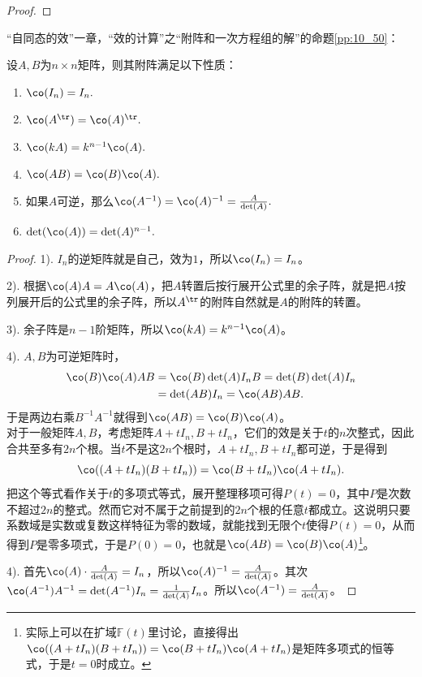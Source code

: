 \documentclass[12pt,UTF8]{ctexbook}
\begin{document}
\begin{appendix}
\begin{proof}
\end{proof}

“自同态的效”一章，“效的计算”之“附阵和一次方程组的解”的命题\ref{pp:10_50}：
\begin{pp}\label{c-25}
    设$A,B$为$n\times n$矩阵，则其附阵满足以下性质：
    \begin{enumerate}
    \item $\co(I_n) = I_n.$
    \item $\co(A^{\tr}) = \co(A)^{\tr}.$
    \item $\co(kA) = k^{n-1}\co(A).$
    \item $\co(AB) = \co(B)\co(A). $
    \item 如果$A$可逆，那么$\co(A^{-1}) = \co(A)^{-1} = \frac{A}{\det(A)}.$
    \item $\det(\co(A)) = \det(A)^{n-1}.$
\end{enumerate}
\end{pp}
\begin{proof}
    1). $I_n$的逆矩阵就是自己，效为$1$，所以$\co(I_n) = I_n$。

    2). 根据$\co(A)A = A\co(A)$，把$A$转置后按行展开公式里的余子阵，就是把$A$按列展开后的公式里的余子阵，所以$A^{\tr}$的附阵自然就是$A$的附阵的转置。

    3). 余子阵是$n-1$阶矩阵，所以$\co(kA) = k^{n-1}\co(A)$。

    4). $A,B$为可逆矩阵时，
    \begin{align*}
        \co(B)\co(A)AB &= \co(B)\det(A)I_nB = \det(B)\det(A)I_n \\
        &= \det(AB)I_n = \co(AB)AB.
    \end{align*}
    于是两边右乘$B^{-1}A^{-1}$就得到$\co(AB) = \co(B)\co(A)$。\\
    对于一般矩阵$A,B$，考虑矩阵$A+tI_n, B+tI_n$，它们的效是关于$t$的$n$次整式，因此合共至多有$2n$个根。当$t$不是这$2n$个根时，$A+tI_n, B+tI_n$都可逆，于是得到
    $$\co((A+tI_n)(B+tI_n)) = \co(B+tI_n)\co(A+tI_n).$$
    把这个等式看作关于$t$的多项式等式，展开整理移项可得$P(t) = 0$，其中$P$是次数不超过$2n$的整式。然而它对不属于之前提到的$2n$个根的任意$t$都成立。这说明只要系数域是实数或复数这样特征为零的数域，就能找到无限个$t$使得$P(t)=0$，从而得到$P$是零多项式，于是$P(0) = 0$，也就是$\co(AB) = \co(B)\co(A)$\footnote{实际上可以在扩域$\mathbb{F}(t)$里讨论，直接得出$\co((A+tI_n)(B+tI_n)) = \co(B+tI_n)\co(A+tI_n)$是矩阵多项式的恒等式，于是$t=0$时成立。}。

    4). 首先$\co(A)\cdot\frac{A}{\det(A)} = I_n$，所以$\co(A)^{-1} = \frac{A}{\det(A)}$。其次$\co(A^{-1})A^{-1} = \det(A^{-1})I_n = \frac{1}{\det(A)}I_n$。所以$\co(A^{-1}) = \frac{A}{\det(A)}$。


\end{proof}
\end{appendix}
\end{document}

